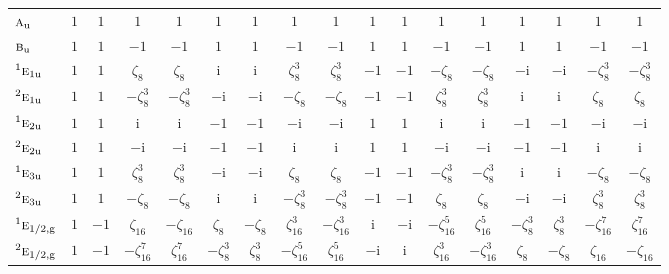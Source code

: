 \documentclass[10pt,a4paper]{article}
\makeatletter
\def\grouprule#1#2{\noalign{\marks\LTgroupmarks{\the\belowrulesep}\nobreak\vskip#1%
  \vskip\aboverulesep}\multispan\LT@cols\unskip{\leaders\hrule\@height#2\hfill\kern\z@}\cr
  \noalign{\penalty\LTrulebreak\vskip\belowrulesep\global\@lastruleclass\z@}}
\numberwithin{equation}{section}
\newcommand{\irr}[1]{\text{\normalfont\scshape #1}}
\newcommand{\conjpair}[1]{{}^{#1}}
\newcommand{\ptag}[1]{\mathrm{#1}}
\newcommand{\iunit}{\mathrm{i}}
\newcommand{\rootunity}[1]{\zeta_{#1}}
\makeatother
\begin{document}
{\begin{longtable}{@{}lcccccccccccccccc@{}}
$\irr{a}_{\ptag{u}}$ & $1$ & $1$ & $1$ & $1$ & $1$ & $1$ & $1$ & $1$ & $1$ & $1$ & $1$ & $1$ & $1$ & $1$ & $1$ & $1$\\
$\irr{b}_{\ptag{u}}$ & $1$ & $1$ & $-1$ & $-1$ & $1$ & $1$ & $-1$ & $-1$ & $1$ & $1$ & $-1$ & $-1$ & $1$ & $1$ & $-1$ & $-1$\\
$\conjpair{1}\irr{e}_{1\ptag{u}}$ & $1$ & $1$ & $\rootunity{8}$ & $\rootunity{8}$ & $\iunit{}$ & $\iunit{}$ & $\rootunity{8}^{3}$ & $\rootunity{8}^{3}$ & $-1$ & $-1$ & $-\rootunity{8}$ & $-\rootunity{8}$ & $-\iunit{}$ & $-\iunit{}$ & $-\rootunity{8}^{3}$ & $-\rootunity{8}^{3}$\\
$\conjpair{2}\irr{e}_{1\ptag{u}}$ & $1$ & $1$ & $-\rootunity{8}^{3}$ & $-\rootunity{8}^{3}$ & $-\iunit{}$ & $-\iunit{}$ & $-\rootunity{8}$ & $-\rootunity{8}$ & $-1$ & $-1$ & $\rootunity{8}^{3}$ & $\rootunity{8}^{3}$ & $\iunit{}$ & $\iunit{}$ & $\rootunity{8}$ & $\rootunity{8}$\\
$\conjpair{1}\irr{e}_{2\ptag{u}}$ & $1$ & $1$ & $\iunit{}$ & $\iunit{}$ & $-1$ & $-1$ & $-\iunit{}$ & $-\iunit{}$ & $1$ & $1$ & $\iunit{}$ & $\iunit{}$ & $-1$ & $-1$ & $-\iunit{}$ & $-\iunit{}$\\
$\conjpair{2}\irr{e}_{2\ptag{u}}$ & $1$ & $1$ & $-\iunit{}$ & $-\iunit{}$ & $-1$ & $-1$ & $\iunit{}$ & $\iunit{}$ & $1$ & $1$ & $-\iunit{}$ & $-\iunit{}$ & $-1$ & $-1$ & $\iunit{}$ & $\iunit{}$\\
$\conjpair{1}\irr{e}_{3\ptag{u}}$ & $1$ & $1$ & $\rootunity{8}^{3}$ & $\rootunity{8}^{3}$ & $-\iunit{}$ & $-\iunit{}$ & $\rootunity{8}$ & $\rootunity{8}$ & $-1$ & $-1$ & $-\rootunity{8}^{3}$ & $-\rootunity{8}^{3}$ & $\iunit{}$ & $\iunit{}$ & $-\rootunity{8}$ & $-\rootunity{8}$\\
$\conjpair{2}\irr{e}_{3\ptag{u}}$ & $1$ & $1$ & $-\rootunity{8}$ & $-\rootunity{8}$ & $\iunit{}$ & $\iunit{}$ & $-\rootunity{8}^{3}$ & $-\rootunity{8}^{3}$ & $-1$ & $-1$ & $\rootunity{8}$ & $\rootunity{8}$ & $-\iunit{}$ & $-\iunit{}$ & $\rootunity{8}^{3}$ & $\rootunity{8}^{3}$\\
\grouprule{0pt}{\lightrulewidth}
$\conjpair{1}\irr{e}_{1/2,\ptag{g}}$ & $1$ & $-1$ & $\rootunity{16}$ & $-\rootunity{16}$ & $\rootunity{8}$ & $-\rootunity{8}$ & $\rootunity{16}^{3}$ & $-\rootunity{16}^{3}$ & $\iunit{}$ & $-\iunit{}$ & $-\rootunity{16}^{5}$ & $\rootunity{16}^{5}$ & $-\rootunity{8}^{3}$ & $\rootunity{8}^{3}$ & $-\rootunity{16}^{7}$ & $\rootunity{16}^{7}$\\
$\conjpair{2}\irr{e}_{1/2,\ptag{g}}$ & $1$ & $-1$ & $-\rootunity{16}^{7}$ & $\rootunity{16}^{7}$ & $-\rootunity{8}^{3}$ & $\rootunity{8}^{3}$ & $-\rootunity{16}^{5}$ & $\rootunity{16}^{5}$ & $-\iunit{}$ & $\iunit{}$ & $\rootunity{16}^{3}$ & $-\rootunity{16}^{3}$ & $\rootunity{8}$ & $-\rootunity{8}$ & $\rootunity{16}$ & $-\rootunity{16}$\\

\end{longtable}}
\end{document}
